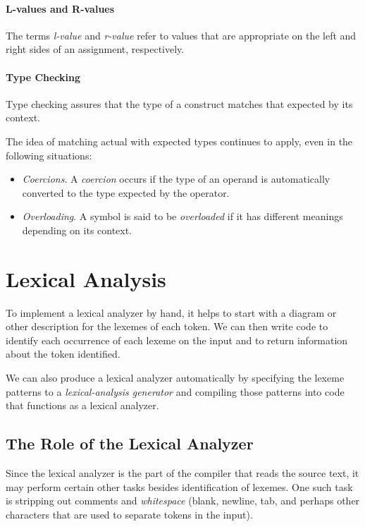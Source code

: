 \documentclass[a4paper,twoside]{book}
\begin{document}
\subsubsection{L-values and R-values}

The terms \textit{l-value} and \textit{r-value} refer to values that are appropriate on the left and right sides of an assignment, respectively.

\subsubsection{Type Checking}

Type checking assures that the type of a construct matches that expected by its context.

The idea of matching actual with expected types continues to apply, even in the following situations:
\begin{itemize}
    \item\textit{Coercions}. A \textit{coercion} occurs if the type of an operand is automatically converted to the type expected by the operator.
    \item\textit{Overloading}. A symbol is said to be \textit{overloaded} if it has different meanings depending on its context.
\end{itemize}

\chapter{Lexical Analysis}

To implement a lexical analyzer by hand, it helps to start with a diagram or other description for the lexemes of each token. We can then write code to identify each occurrence of each lexeme on the input and to return information about the token identified.

We can also produce a lexical analyzer automatically by specifying the lexeme patterns to a \textit{lexical-analysis generator} and compiling those patterns into code that functions as a lexical analyzer.

\section{The Role of the Lexical Analyzer}

Since the lexical analyzer is the part of the compiler that reads the source text, it may perform certain other tasks besides identification of lexemes. One such task is stripping out comments and \textit{whitespace} (blank, newline, tab, and perhaps other characters that are used to separate tokens in the input).
\end{document}
